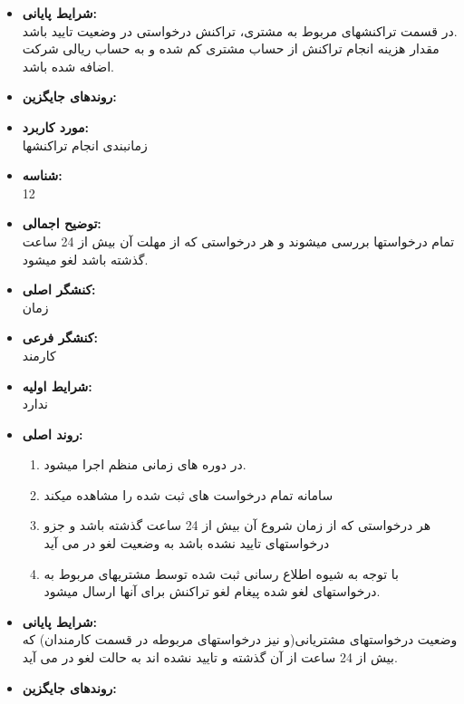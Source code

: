 \documentclass{article}
\begin{document}
\begin{itemize}
\begin{enumerate}
\end{enumerate}

\item \textbf{شرایط پایانی:}\\ 
در قسمت تراکنشهای مربوط به مشتری، تراکنش درخواستی در وضعیت تایید باشد.\\
مقدار هزینه انجام تراکنش از حساب مشتری کم شده و به حساب ریالی شرکت اضافه شده باشد.\\
\item \textbf{روندهای جایگزین:}\\


\end{itemize}

\noindent\makebox[\linewidth]{\rule{\paperwidth}{0.4pt}}

\begin{itemize}
\item \textbf{مورد کاربرد:}\\
زمانبندی انجام تراکنشها
\item \textbf{شناسه:}\\
12
\item \textbf{توضیح اجمالی:}\\
تمام درخواستها بررسی میشوند و هر درخواستی که از مهلت آن بیش از 24 ساعت گذشته باشد لغو میشود.
\item \textbf{کنشگر اصلی:}\\
زمان
\item \textbf{کنشگر فرعی:}\\
کارمند
\item \textbf{شرایط اولیه:}\\
ندارد
\item \textbf{روند اصلی:}\\
\begin{enumerate}
\item در دوره های زمانی منظم اجرا میشود.
\item سامانه تمام درخواست های ثبت شده را مشاهده میکند
\item هر درخواستی که از زمان شروع آن بیش از 24 ساعت گذشته باشد و جزو درخواستهای تایید نشده باشد به وضعیت لغو در می آید
\item  با توجه به شیوه اطلاع رسانی ثبت شده توسط مشتریهای مربوط به درخواستهای لغو شده پیغام لغو تراکنش برای آنها ارسال میشود.

\end{enumerate}

\item \textbf{شرایط پایانی:}\\ 
وضعیت درخواستهای مشتریانی(و نیز درخواستهای مربوطه در قسمت کارمندان) که بیش از 24 ساعت از آن گذشته و تایید نشده اند به حالت لغو در می آید.\\
\item \textbf{روندهای جایگزین:}\\

\end{itemize}
\end{document}
